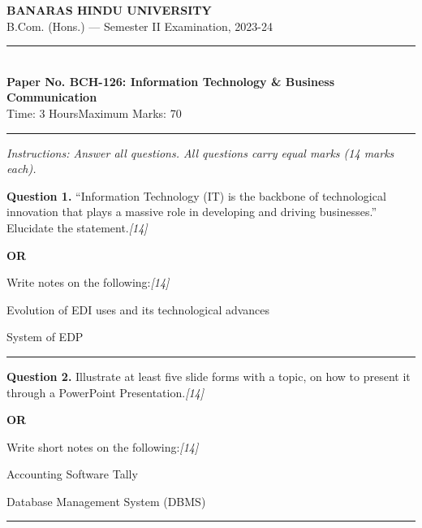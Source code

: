 \documentclass[11pt,a4paper]{article}
\newcommand{\pts}[1]{\hfill   \textit{[#1]}}
\begin{document}
\begin{center}
  {\large\bfseries BANARAS HINDU UNIVERSITY}\\[2pt]
  {\normalsize B.Com. (Hons.) --- Semester II Examination, 2023-24}\\[6pt]
  \rule{0.8\linewidth}{0.5pt}\\[6pt]
  {\large\bfseries Paper No. BCH-126: Information Technology \& Business Communication}\\[4pt]
  {\normalsize Time: 3 Hours\hfill Maximum Marks: 70}
\end{center}

\rule{\linewidth}{0.4pt}

\smallskip



\noindent   \textit{Instructions: Answer all questions. All questions carry equal marks (14 marks each).}

\bigskip




\noindent   \textbf{Question 1.}
``Information Technology (IT) is the backbone of technological innovation that plays a massive role in developing and driving businesses.'' Elucidate the statement.\pts{14}

\centerline{   \textbf{OR}}

Write notes on the following:\pts{14}

\begin{parts}
  \item Evolution of EDI uses and its technological advances
  \item System of EDP
\end{parts}

\medskip\rule{\linewidth}{0.2pt}




\noindent   \textbf{Question 2.}
Illustrate at least five slide forms with a topic, on how to present it through a PowerPoint Presentation.\pts{14}

\centerline{   \textbf{OR}}

Write short notes on the following:\pts{14}

\begin{parts}
  \item Accounting Software Tally
  \item Database Management System (DBMS)
\end{parts}

\medskip\rule{\linewidth}{0.2pt}
\end{document}
